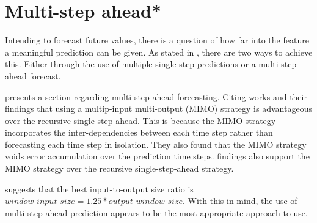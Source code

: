\section{Multi-step ahead*}
\label{section:RelatedWork:multi-step-ahead}
Intending to forecast future values, there is a question of how far into the feature a meaningful prediction can be given.
As stated in , there are two ways to achieve this.
Either through the use of multiple single-step predictions or a multi-step-ahead forecast.

\cite{Hewamalage2021} presents a section regarding multi-step-ahead forecasting.
Citing \cite{BenTaieb2011} works and their findings that using a multip-input multi-output (MIMO) strategy is
advantageous over the recursive single-step-ahead.
This is because the MIMO strategy incorporates the inter-dependencies between each time step rather than forecasting
each time step in isolation.
They also found that the MIMO strategy voids error
accumulation over the prediction time steps.
\cite{Ramos2015} findings also support the MIMO strategy over the recursive
single-step-ahead strategy.

\cite{Hewamalage2021} suggests that the best input-to-output size ratio
is $window\_input\_size = 1.25 * output\_window\_size$.
With this in mind, the use of multi-step-ahead prediction appears to be the most appropriate approach to use.